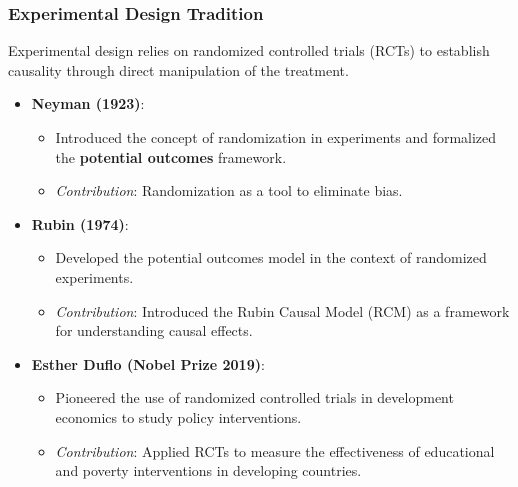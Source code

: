 \documentclass[xcolor=svgnames,t]{beamer}
\begin{document}
\begin{frame}
    \frametitle{Experimental Design Tradition}
    
    Experimental design relies on randomized controlled trials (RCTs) to establish causality through direct manipulation of the treatment.

    \begin{itemize}
        \item \textbf{Neyman (1923)}: 
        \begin{itemize}
            \item Introduced the concept of randomization in experiments and formalized the \textbf{potential outcomes} framework.
            \item \textit{Contribution}: Randomization as a tool to eliminate bias.
        \end{itemize}
        
        \pause %
        \item \textbf{Rubin (1974)}: 
        \begin{itemize}
            \item Developed the potential outcomes model in the context of randomized experiments.
            \item \textit{Contribution}: Introduced the Rubin Causal Model (RCM) as a framework for understanding causal effects.
        \end{itemize}
        
        \pause %
        \item \textbf{Esther Duflo (Nobel Prize 2019)}: 
        \begin{itemize}
            \item Pioneered the use of randomized controlled trials in development economics to study policy interventions.
            \item \textit{Contribution}: Applied RCTs to measure the effectiveness of educational and poverty interventions in developing countries.
        \end{itemize}
    \end{itemize}

\end{frame}
\end{document}
